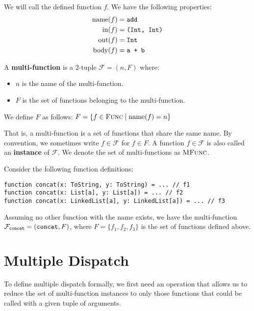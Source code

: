 \noindent We will call the defined function $f$. We have the following properties:
\begin{align*}
	\operatorname{name}(f) &= \text{\texttt{add}} \\
	\operatorname{in}(f) &= \texttt{(Int, Int)} \\
	\operatorname{out}(f) &= \texttt{Int} \\
	\operatorname{body}(f) &= \text{\texttt{a + b}}
\end{align*}

\begin{definition}
	A \textbf{multi-function} is a 2-tuple $\mathcal{F} = (n, F)$ where:
	\begin{itemize}
		\item $n$ is the name of the multi-function.
		\item $F$ is the set of functions belonging to the multi-function.
	\end{itemize}

	\noindent We define $F$ as follows: $F = \{ f \in \textsc{Func} \mid \operatorname{name}(f) = n \}$
\end{definition}

\noindent That is, a multi-function is a set of functions that share the same name. By convention, we sometimes write $f \in \mathcal{F}$ for $f \in F$. A function $f \in \mathcal{F}$ is also called an \textbf{instance} of $\mathcal{F}$. We denote the set of multi-functions as $\textsc{MFunc}$.

\bigskip

\noindent Consider the following function definitions:
\begin{lstlisting}
function concat(x: ToString, y: ToString) = ... // f1
function concat(x: List[a], y: List[a]) = ... // f2
function concat(x: LinkedList[a], y: LinkedList[a]) = ... // f3
\end{lstlisting}
	
\noindent Assuming no other function with the name  exists, we have the multi-function $\mathcal{F}_{\text{\texttt{concat}}} = (\text{\texttt{concat}}, F)$, where $F = \{ f_1, f_2, f_3 \}$ is the set of  functions defined above.



\section{Multiple Dispatch}

To define multiple dispatch formally, we first need an operation that allows us to reduce the set of multi-function instances to only those functions that could be called with a given tuple of arguments.

